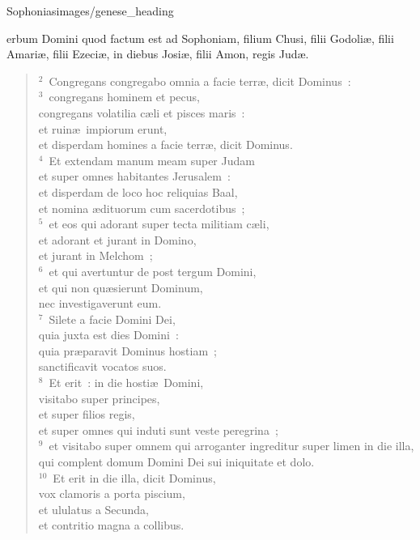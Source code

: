 {Sophonias}{images/genese_heading}


\bchapter
{}erbum Domini quod factum est ad Sophoniam, filium Chusi, filii Godoli\ae , filii Amari\ae , filii Ezeci\ae , in diebus Josi\ae , filii Amon, regis Jud\ae .


\begin{flushleft}\begin{verse}\vspace{6pt}${}^{2}$~Congregans congregabo omnia a facie terr\ae , dicit Dominus~:\\
${}^{3}$~congregans hominem et pecus,\\ congregans volatilia c\ae li et pisces maris~:\\ et ruin\ae\ impiorum erunt,\\ et disperdam homines a facie terr\ae , dicit Dominus.\\
${}^{4}$~Et extendam manum meam super Judam\\ et super omnes habitantes Jerusalem~:\\ et disperdam de loco hoc reliquias Baal,\\ et nomina \ae dituorum cum sacerdotibus~;\\
${}^{5}$~et eos qui adorant super tecta militiam c\ae li,\\ et adorant et jurant in Domino,\\ et jurant in Melchom~;\\
${}^{6}$~et qui avertuntur de post tergum Domini,\\ et qui non qu\ae sierunt Dominum,\\ nec investigaverunt eum.\\
${}^{7}$~Silete a facie Domini Dei,\\ quia juxta est dies Domini~:\\ quia pr\ae paravit Dominus hostiam~;\\ sanctificavit vocatos suos.\\
${}^{8}$~Et erit~: in die hosti\ae\ Domini,\\ visitabo super principes,\\ et super filios regis,\\ et super omnes qui induti sunt veste peregrina~;\\
${}^{9}$~et visitabo super omnem qui arroganter ingreditur super limen in die illa,\\ qui complent domum Domini Dei sui iniquitate et dolo.\\
${}^{10}$~Et erit in die illa, dicit Dominus,\\ vox clamoris a porta piscium,\\ et ululatus a Secunda,\\ et contritio magna a collibus.\\

\end{verse}
\end{flushleft}

